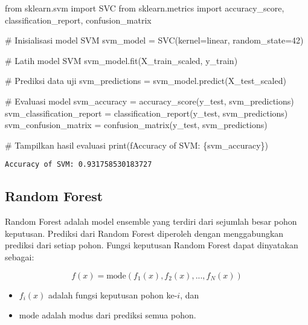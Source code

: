 \documentclass[
  letterpaper,
]{krantz}
\makeatletter
\newenvironment{Shaded}{\begin{snugshade}}{\end{snugshade}}
\newcommand{\BuiltInTok}[1]{\textcolor[rgb]{0.00,0.23,0.31}{#1}}
\newcommand{\CommentTok}[1]{\textcolor[rgb]{0.37,0.37,0.37}{#1}}
\newcommand{\DecValTok}[1]{\textcolor[rgb]{0.68,0.00,0.00}{#1}}
\newcommand{\ImportTok}[1]{\textcolor[rgb]{0.00,0.46,0.62}{#1}}
\newcommand{\NormalTok}[1]{\textcolor[rgb]{0.00,0.23,0.31}{#1}}
\newcommand{\OperatorTok}[1]{\textcolor[rgb]{0.37,0.37,0.37}{#1}}
\newcommand{\SpecialCharTok}[1]{\textcolor[rgb]{0.37,0.37,0.37}{#1}}
\newcommand{\SpecialStringTok}[1]{\textcolor[rgb]{0.13,0.47,0.30}{#1}}
\newcommand{\StringTok}[1]{\textcolor[rgb]{0.13,0.47,0.30}{#1}}
\providecommand{\tightlist}{%
  \setlength{\itemsep}{0pt}\setlength{\parskip}{0pt}}\usepackage{longtable,booktabs,array}
\newenvironment{kframe}{%
\medskip{}
\setlength{\fboxsep}{.8em}
 \def\at@end@of@kframe{}%
 \ifinner\ifhmode%
  \def\at@end@of@kframe{\end{minipage}}%
  \begin{minipage}{\columnwidth}%
 \fi\fi%
 \def\FrameCommand##1{\hskip\@totalleftmargin \hskip-\fboxsep
 \colorbox{shadecolor}{##1}\hskip-\fboxsep
     \hskip-\linewidth \hskip-\@totalleftmargin \hskip\columnwidth}%
 \MakeFramed {\advance\hsize-\width
   \@totalleftmargin\z@ \linewidth\hsize
   \@setminipage}}%
 {\par\unskip\endMakeFramed%
 \at@end@of@kframe}
\renewenvironment{Shaded}{\begin{kframe}}{\end{kframe}}
\makeatother
\begin{document}
\begin{Shaded}
\begin{Highlighting}[]
\ImportTok{from}\NormalTok{ sklearn.svm }\ImportTok{import}\NormalTok{ SVC}
\ImportTok{from}\NormalTok{ sklearn.metrics }\ImportTok{import}\NormalTok{ accuracy\_score, classification\_report, confusion\_matrix}

\CommentTok{\# Inisialisasi model SVM}
\NormalTok{svm\_model }\OperatorTok{=}\NormalTok{ SVC(kernel}\OperatorTok{=}\StringTok{\textquotesingle{}linear\textquotesingle{}}\NormalTok{, random\_state}\OperatorTok{=}\DecValTok{42}\NormalTok{)}

\CommentTok{\# Latih model SVM}
\NormalTok{svm\_model.fit(X\_train\_scaled, y\_train)}

\CommentTok{\# Prediksi data uji}
\NormalTok{svm\_predictions }\OperatorTok{=}\NormalTok{ svm\_model.predict(X\_test\_scaled)}

\CommentTok{\# Evaluasi model}
\NormalTok{svm\_accuracy }\OperatorTok{=}\NormalTok{ accuracy\_score(y\_test, svm\_predictions)}
\NormalTok{svm\_classification\_report }\OperatorTok{=}\NormalTok{ classification\_report(y\_test, svm\_predictions)}
\NormalTok{svm\_confusion\_matrix }\OperatorTok{=}\NormalTok{ confusion\_matrix(y\_test, svm\_predictions)}

\CommentTok{\# Tampilkan hasil evaluasi}
\BuiltInTok{print}\NormalTok{(}\SpecialStringTok{f\textquotesingle{}Accuracy of SVM: }\SpecialCharTok{\{}\NormalTok{svm\_accuracy}\SpecialCharTok{\}}\SpecialStringTok{\textquotesingle{}}\NormalTok{)}
\end{Highlighting}
\end{Shaded}

\begin{verbatim}
Accuracy of SVM: 0.931758530183727
\end{verbatim}

\hypertarget{random-forest}{%
\subsection{Random Forest}\label{random-forest}}

Random Forest adalah model ensemble yang terdiri dari sejumlah besar
pohon keputusan. Prediksi dari Random Forest diperoleh dengan
menggabungkan prediksi dari setiap pohon. Fungsi keputusan Random Forest
dapat dinyatakan sebagai:

\[
f(x) = \text{mode}(f_1(x), f_2(x), ..., f_N(x))
\]

\begin{itemize}
\tightlist
\item
  \(f_i(x)\) adalah fungsi keputusan pohon ke-\(i\), dan
\item
  \(\text{mode}\) adalah modus dari prediksi semua pohon.
\end{itemize}
\end{document}
